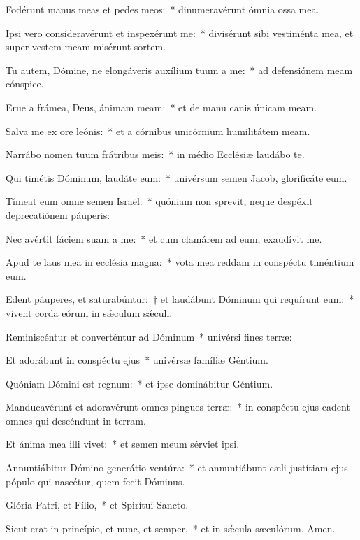 \item Fodérunt manus meas et pedes meos:~* dinumeravérunt ómnia ossa mea.

\item Ipsi vero consideravérunt et inspexérunt me:~* divisérunt sibi vestiménta mea, et super vestem meam misérunt sortem.

\item Tu autem, Dómine, ne elongáveris auxílium tuum a me:~* ad defensiónem meam cónspice.

\item Erue a frámea, Deus, ánimam meam:~* et de manu canis únicam meam.

\item Salva me ex ore leónis:~* et a córnibus unicórnium humilitátem meam.

\item Narrábo nomen tuum frátribus meis:~* in médio Ecclésiæ laudábo te.

\item Qui timétis Dóminum, laudáte eum:~* univérsum semen Jacob, glorificáte eum.

\item Tímeat eum omne semen Israël:~* quóniam non sprevit, neque despéxit deprecatiónem páuperis:

\item Nec avértit fáciem suam a me:~* et cum clamárem ad eum, exaudívit me.

\item Apud te laus mea in ecclésia magna:~* vota mea reddam in conspéctu timéntium eum.

\item Edent páuperes, et saturabúntur:~† et laudábunt Dóminum qui requírunt eum:~* vivent corda eórum in sǽculum sǽculi.

\item Reminiscéntur et converténtur ad Dóminum~* univérsi fines terræ:

\item Et adorábunt in conspéctu ejus~* univérsæ famíliæ Géntium.

\item Quóniam Dómini est regnum:~* et ipse dominábitur Géntium.

\item Manducavérunt et adoravérunt omnes pingues terræ:~* in conspéctu ejus cadent omnes qui descéndunt in terram.

\item Et ánima mea illi vivet:~* et semen meum sérviet ipsi.

\item Annuntiábitur Dómino generátio ventúra:~* et annuntiábunt cæli justítiam ejus pópulo qui nascétur, quem fecit Dóminus.

\item Glória Patri, et Fílio,~* et Spirítui Sancto.

\item Sicut erat in princípio, et nunc, et semper,~* et in sǽcula sæculórum. Amen.

